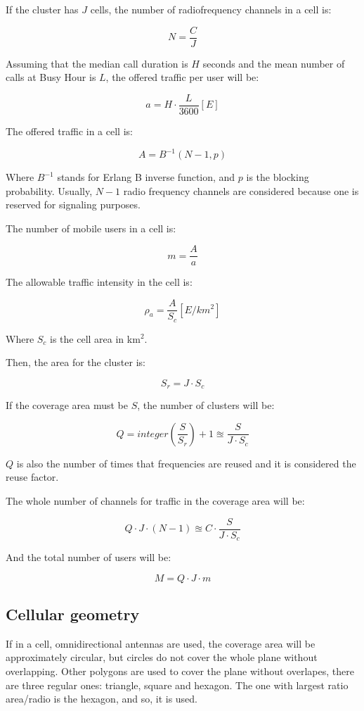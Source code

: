 \documentclass[
	12pt,
	twoside
]{book}
\begin{document}
If the cluster has $J$ cells, the number of radiofrequency channels in a cell is:

$$
	N = \frac {C} {J}
$$

Assuming that the median call duration is $H$ seconds and the mean number of calls at Busy Hour is $L$, the offered traffic per user will be:

$$
	a = H \cdot \frac {L} {3600} [E]
$$

The offered traffic in a cell is:

$$
	A = B^{-1} (N - 1, p)
$$

Where $B^{-1}$ stands for Erlang B inverse function, and $p$ is the blocking probability. Usually, $N - 1$ radio frequency channels are considered because one is reserved for signaling purposes.

The number of mobile users in a cell is:

$$
	m = \frac {A} {a}
$$

The allowable traffic intensity in the cell is:

$$
	\rho_a = \frac {A} {S_c} [E / km^2]
$$

Where $S_c$ is the cell area in km$^2$.

Then, the area for the cluster is:

$$
	S_r = J \cdot S_c
$$

If the coverage area must be $S$, the number of clusters will be:

$$
	Q = integer \left( \frac {S} {S_r} \right) + 1 \approxeq \frac {S} {J \cdot S_c}
$$

$Q$ is also the number of times that frequencies are reused and it is considered the reuse factor.

The whole number of channels for traffic in the coverage area will be:

$$
	Q \cdot J \cdot (N - 1) \approxeq C \cdot \frac {S} {J \cdot S_c}
$$

And the total number of users will be:

$$
	M = Q \cdot J \cdot m
$$

\subsection{Cellular geometry}

If in a cell, omnidirectional antennas are used, the coverage area will be approximately circular, but circles do not cover the whole plane without overlapping. Other polygons are used to cover the plane without overlapes, there are three regular ones: triangle, square and hexagon. The one with largest ratio area/radio is the hexagon, and so, it is used.
\end{document}
